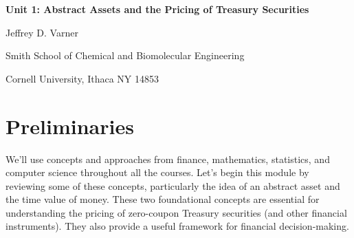 \documentclass[11pt]{article}
\theoremstyle{definition}
\begin{document}
{\par\centering\textbf{\Large Unit 1: Abstract Assets and the Pricing of Treasury Securities}}
\vspace{0.2in}
{\par \centering \large{Jeffrey D. Varner}}
\vspace{0.05in}
{\par \centering \large{Smith School of Chemical and Biomolecular Engineering}}
{\par \centering \large{Cornell University, Ithaca NY 14853}}

\date{}
\thispagestyle{empty}

\setcounter{page}{1}

\tableofcontents
\clearpage
\listoffigures
\clearpage
\listofalgorithms
\clearpage

\section{Preliminaries}
We'll use concepts and approaches from finance, mathematics, statistics, and computer science throughout all the courses.
Let's begin this module by reviewing some of these concepts, particularly the idea of an abstract asset and the time value of money.
These two foundational concepts are essential for understanding the pricing of zero-coupon Treasury securities (and other financial instruments).
They also provide a useful framework for financial decision-making.
\end{document}
